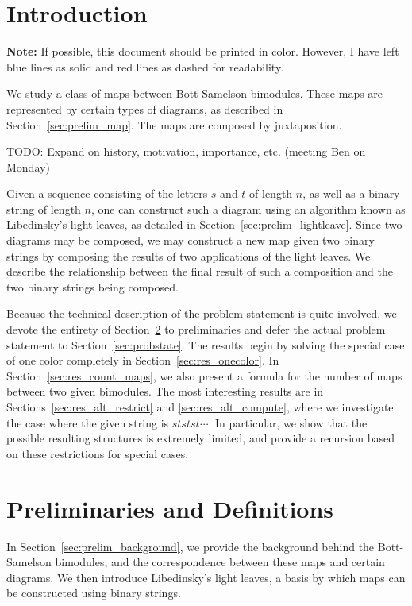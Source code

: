 
\section{Introduction}
\textbf{Note:} If possible, this document should be printed in color.  However, I have left blue lines as solid and red lines as dashed for readability.

We study a class of maps between Bott-Samelson bimodules.  These maps are represented by certain types of diagrams, as described in Section~\ref{sec:prelim_map}.  The maps are composed by juxtaposition.

TODO: Expand on history, motivation, importance, etc. (meeting Ben on Monday)

Given a sequence consisting of the letters $s$ and $t$ of length $n$, as well as a binary string of length $n$, one can construct such a diagram using an algorithm known as Libedinsky's light leaves, as detailed in Section~\ref{sec:prelim_lightleave}.  Since two diagrams may be composed, we may construct a new map given two binary strings by composing the results of two applications of the light leaves.  We describe the relationship between the final result of such a composition and the two binary strings being composed.

Because the technical description of the problem statement is quite involved, we devote the entirety of Section~\ref{sec:prelim} to preliminaries and defer the actual problem statement to Section~\ref{sec:probstate}.  The results begin by solving the special case of one color completely in Section~\ref{sec:res_onecolor}.  In Section~\ref{sec:res_count_maps}, we also present a formula for the number of maps between two given bimodules.  The most interesting results are in Sections~\ref{sec:res_alt_restrict} and \ref{sec:res_alt_compute}, where we investigate the case where the given string is $ststst\cdots$.  In particular, we show that the possible resulting structures is extremely limited, and provide a recursion based on these restrictions for special cases. 

\section{Preliminaries and Definitions}
\label{sec:prelim}
In Section~\ref{sec:prelim_background}, we provide the background behind the Bott-Samelson bimodules, and the correspondence between these maps and certain diagrams.  We then introduce Libedinsky's light leaves, a basis by which maps can be constructed using binary strings.

